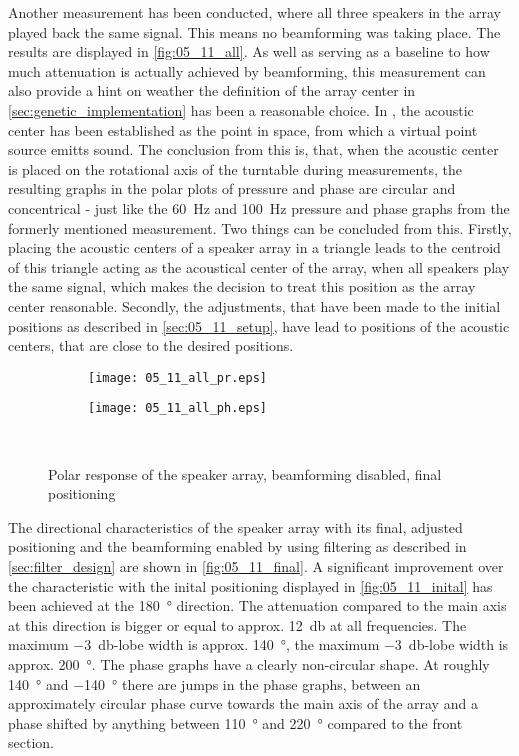 Another measurement has been conducted, where all three speakers in the array played back the same signal. This means no beamforming was taking place. The results are displayed in \autoref{fig:05_11_all}. As well as serving as a baseline to how much attenuation is actually achieved by beamforming, this measurement can also provide a hint on weather the definition of the array center in \autoref{sec:genetic_implementation} has been a reasonable choice.
In \label{sec:ac_center}, the acoustic center has been established as the point in space, from which a virtual point source emitts sound. The conclusion from this is, that, when the acoustic center is placed on the rotational axis of the turntable during measurements, the resulting graphs in the polar plots of pressure and phase are circular and concentrical - just like the \SI{60}{\hertz} and \SI{100}{\hertz} pressure and phase graphs from the formerly mentioned measurement. 
Two things can be concluded from this. Firstly, placing the acoustic centers of a speaker array in a triangle leads to the centroid of this triangle acting as the acoustical center of the array, when all speakers play the same signal, which makes the decision to treat this position as the array center reasonable. Secondly, the adjustments, that have been made to the initial positions as described in \autoref{sec:05_11_setup}, have lead to positions of the acoustic centers, that are close to the desired positions.

\begin{figure}[h]
\begin{subfigure}[c]{0.5\textwidth}
\texttt{[image: 05\_11\_all\_pr.eps]}
\label{fig:05_11_all_pr}
\end{subfigure}
\begin{subfigure}[c]{0.5\textwidth}
\texttt{[image: 05\_11\_all\_ph.eps]}
\label{fig:05_11_all_ph}
\end{subfigure}\\
\caption{Polar response of the speaker array, beamforming disabled, final positioning}  
\label{fig:05_11_all}
\end{figure}

The directional characteristics of the speaker array with its final, adjusted positioning and the beamforming enabled by using filtering as described in \autoref{sec:filter_design} are shown in \autoref{fig:05_11_final}. A significant improvement over the characteristic with the inital positioning displayed in \autoref{fig:05_11_inital} has been achieved at the \SI{180}{\degree} direction. The attenuation compared to the main axis at this direction is bigger or equal to approx. \SI{12}{\decibel} at all frequencies. The maximum \SI{-3}{\decibel}-lobe width is approx. \SI{140}{\degree}, the maximum \SI{-3}{\decibel}-lobe width is approx. \SI{200}{\degree}. The phase graphs have a clearly non-circular shape. At roughly \SI{140}{\degree} and \SI{-140}{\degree} there are jumps in the phase graphs, between an approximately circular phase curve towards the main axis of the array and a phase shifted by anything between \SI{110}{\degree} and \SI{220}{\degree} compared to the front section.

